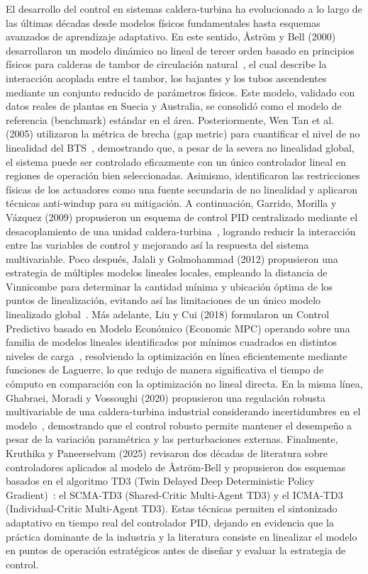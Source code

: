 \documentclass[final,5p,times,twocolumn,authoryear,11pt]{elsarticle}
\begin{document}
El desarrollo del control en sistemas caldera-turbina ha evolucionado a lo largo de las últimas décadas desde modelos físicos fundamentales hasta esquemas avanzados de aprendizaje adaptativo. En este sentido, Åström y Bell (2000) desarrollaron un modelo dinámico no lineal de tercer orden basado en principios físicos para calderas de tambor de circulación natural~\citep{astrom2000drum}, el cual describe la interacción acoplada entre el tambor, los bajantes y los tubos ascendentes mediante un conjunto reducido de parámetros físicos. Este modelo, validado con datos reales de plantas en Suecia y Australia, se consolidó como el modelo de referencia (benchmark) estándar en el área. Posteriormente, Wen Tan et al. (2005) utilizaron la métrica de brecha (gap metric) para cuantificar el nivel de no linealidad del BTS~\citep{tan2005analysis}, demostrando que, a pesar de la severa no linealidad global, el sistema puede ser controlado eficazmente con un único controlador lineal en regiones de operación bien seleccionadas. Asimismo, identificaron las restricciones físicas de los actuadores como una fuente secundaria de no linealidad y aplicaron técnicas anti-windup para su mitigación. A continuación, Garrido, Morilla y Vázquez (2009) propusieron un esquema de control PID centralizado mediante el desacoplamiento de una unidad caldera-turbina~\citep{garrido2009centralized}, logrando reducir la interacción entre las variables de control y mejorando así la respuesta del sistema multivariable. Poco después, Jalali y Golmohammad (2012) propusieron una estrategia de múltiples modelos lineales locales, empleando la distancia de Vinnicombe para determinar la cantidad mínima y ubicación óptima de los puntos de linealización, evitando así las limitaciones de un único modelo linealizado global~\citep{jalali2012multiple}. Más adelante, Liu y Cui (2018) formularon un Control Predictivo basado en Modelo Económico (Economic MPC) operando sobre una familia de modelos lineales identificados por mínimos cuadrados en distintos niveles de carga~\citep{liu2018economic}, resolviendo la optimización en línea eficientemente mediante funciones de Laguerre, lo que redujo de manera significativa el tiempo de cómputo en comparación con la optimización no lineal directa. En la misma línea, Ghabraei, Moradi y Vossoughi (2020) propusieron una regulación robusta multivariable de una caldera-turbina industrial considerando incertidumbres en el modelo~\citep{ghabraei2020multivariable}, demostrando que el control robusto permite mantener el desempeño a pesar de la variación paramétrica y las perturbaciones externas. Finalmente, Kruthika y Paneerselvam (2025) revisaron dos décadas de literatura sobre controladores aplicados al modelo de Åström-Bell y propusieron dos esquemas basados en el algoritmo TD3 (Twin Delayed Deep Deterministic Policy Gradient)~\citep{kruthika2025novel}: el SCMA-TD3 (Shared-Critic Multi-Agent TD3) y el ICMA-TD3 (Individual-Critic Multi-Agent TD3). Estas técnicas permiten el sintonizado adaptativo en tiempo real del controlador PID, dejando en evidencia que la práctica dominante de la industria y la literatura consiste en linealizar el modelo en puntos de operación estratégicos antes de diseñar y evaluar la estrategia de control.
\end{document}
